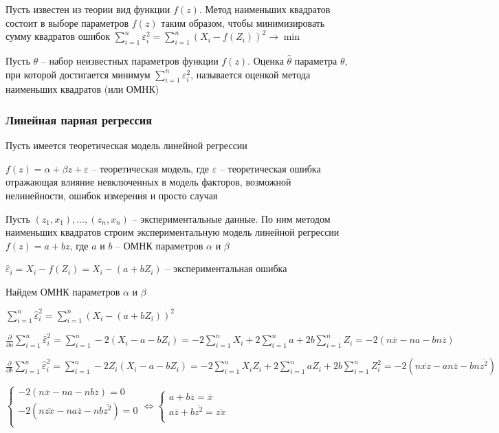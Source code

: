 \hypertarget{method_of_least_squares}{}

Пусть известен из теории вид функции $f(z)$. Метод наименьших квадратов состоит в выборе параметров $f(z)$ таким образом,
чтобы минимизировать сумму квадратов ошибок $\sum_{i = 1}^n \varepsilon_i^2 = \sum_{i = 1}^n (X_i - f(Z_i))^2 \rightarrow \min$

\Def Пусть $\theta$ -- набор неизвестных параметров функции $f(z)$. Оценка $\hat \theta$ параметра $\theta$, 
при которой достигается минимум $\sum_{i = 1}^n \varepsilon_i^2$, называется оценкой метода наименьших квадратов (или ОМНК)

\subsubsection{Линейная парная регрессия}

Пусть имеется теоретическая модель линейной регрессии 

$f(z) = \alpha + \beta z + \varepsilon$ -- теоретическая модель, где $\varepsilon$ -- теоретическая ошибка
отражающая влияние невключенных в модель факторов, возможной нелинейности, ошибок измерения и просто случая

Пусть $(z_1, x_1), \dots, (z_n, x_n)$ -- экспериментальные данные. По ним методом наименьших квадратов строим
экспериментальную модель линейной регрессии $f(z) = a + b z$, где $a$ и $b$ -- ОМНК параметров $\alpha$ и $\beta$

$\hat \varepsilon_i = X_i - f(Z_i) = X_i - (a + b Z_i)$ -- экспериментальная ошибка

Найдем ОМНК параметров $\alpha$ и $\beta$

$\sum_{i = 1}^n \hat \varepsilon_i^2 = \sum_{i = 1}^n (X_i - (a + b Z_i))^2$

$\frac{\partial}{\partial a} \sum_{i = 1}^n \hat \varepsilon_i^2 = \sum_{i = 1}^n -2 (X_i - a - b Z_i) = 
-2 \sum_{i = 1}^n X_i + 2\sum_{i = 1}^n a + 2b \sum_{i = 1}^n Z_i = -2(n \overline{x} - na - bn \overline{z})$

$\frac{\partial}{\partial b} \sum_{i = 1}^n \hat \varepsilon_i^2 = \sum_{i = 1}^n -2 Z_i (X_i - a - b Z_i) = 
-2 \sum_{i = 1}^n X_i Z_i + 2\sum_{i = 1}^n a Z_i + 2b \sum_{i = 1}^n Z_i^2 = -2(n \overline{x z} - a n \overline{z} - bn \overline{z^2})$

$\begin{cases}
    -2 (n \overline{x} - na - nb \overline{z}) = 0 \\
    -2 (n \overline{zx} - na \overline{z} - nb \overline{z^2}) = 0 \\
\end{cases} \Longleftrightarrow \begin{cases}
    a + b\overline{z} = \overline{x} \\
    a\overline{z} + b \overline{z^2} = \overline{zx} \\
\end{cases}$

